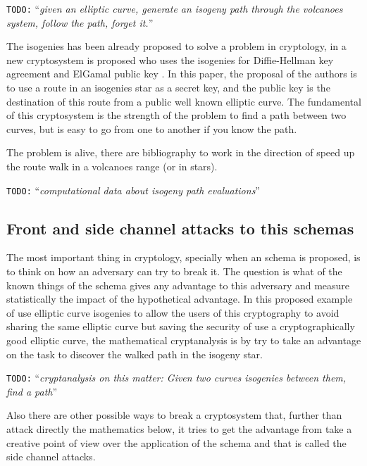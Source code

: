 \documentclass[10pt,a4paper,twoside]{llncs}
\newcommand{\todo}[1]{\texttt{\color{red}TODO:} ``\emph{#1}''}
\begin{document}
\todo{given an elliptic curve, generate an isogeny path through the volcanoes system, follow the path, forget it.}

The isogenies has been already proposed to solve a problem in cryptology, in \cite{Rostovtsev06public} a new cryptosystem is proposed who uses the isogenies for Diffie-Hellman key agreement \cite{Diffie76newdirections} and ElGamal public key \cite{ElGamal85pkdlp}. In this paper, the proposal of the authors is to use a route in an isogenies star as a secret key, and the public key is the destination of this route from a public well known elliptic curve. The fundamental of this cryptosystem is the strength of the problem to find a path between two curves, but is easy to go from one to another if you know the path.

The problem is alive, there are bibliography \cite{SubExpIso} to work in the direction of speed up the route walk in a volcanoes range (or in stars). 

\todo{computational data about isogeny path evaluations}

\subsection{Front and side channel attacks to this schemas \label{sec:cryptanalysis}}

The most important thing in cryptology, specially when an schema is proposed, is to think on how an adversary can try to break it. The question is what of the known things of the schema gives any advantage to this adversary and measure statistically the impact of the hypothetical advantage. In this proposed example of use elliptic curve isogenies to allow the users of this cryptography to avoid sharing the same elliptic curve but saving the security of use a cryptographically good elliptic curve, the mathematical cryptanalysis is by try to take an advantage on the task to discover the walked path in the isogeny star.

\todo{cryptanalysis on this matter: Given two curves isogenies between them, find a path}\cite{FastBetweenIso}

Also there are other possible ways to break a cryptosystem that, further than attack directly the mathematics below, it tries to get the advantage from take a creative point of view over the application of the schema and that is called the side channel attacks.
\end{document}

